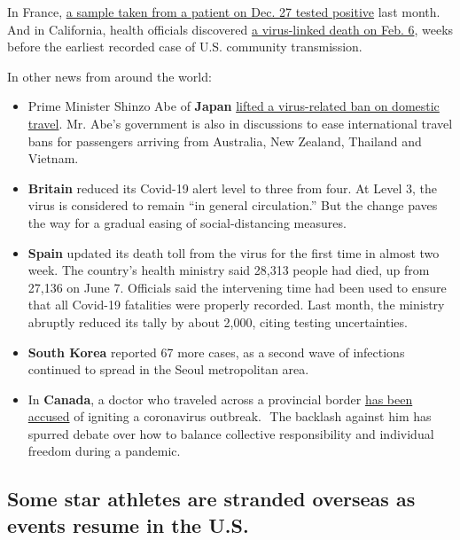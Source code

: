 In France,
\href{https://www.nytimes3xbfgragh.onion/2020/05/05/world/europe/france-coronavirus-timeline.html}{a
sample taken from a patient on Dec. 27 tested positive} last month. And
in California, health officials discovered
\href{https://www.nytimes3xbfgragh.onion/2020/04/22/us/santa-clara-county-coronavirus-death.html}{a
virus-linked death on Feb. 6}, weeks before the earliest recorded case
of U.S. community transmission.

In other news from around the world:

\begin{itemize}
\item
  Prime Minister Shinzo Abe of \textbf{Japan}
  \href{https://www.nytimes3xbfgragh.onion/reuters/2020/06/18/world/asia/18reuters-health-coronavirus-japan-tourism.html}{lifted
  a virus-related ban on domestic travel}. Mr. Abe's government is also
  in discussions to ease international travel bans for passengers
  arriving from Australia, New Zealand, Thailand and Vietnam.
\item
  \textbf{Britain} reduced its Covid-19 alert level to three from four.
  At Level 3, the virus is considered to remain ``in general
  circulation.'' But the change paves the way for a gradual easing of
  social-distancing measures.
\item
  \textbf{Spain} updated its death toll from the virus for the first
  time in almost two week. The country's health ministry said 28,313
  people had died, up from 27,136 on June 7. Officials said the
  intervening time had been used to ensure that all Covid-19 fatalities
  were properly recorded. Last month, the ministry abruptly reduced its
  tally by about 2,000, citing testing uncertainties.
\item
  \textbf{South Korea} reported 67 more cases, as a second wave of
  infections continued to spread in the Seoul metropolitan area.
\item
  In \textbf{Canada}, a doctor who traveled across a provincial border
  \href{https://nyti.ms/2YFwLqs}{has been accused} of igniting a
  coronavirus outbreak. ​ ​​The backlash against him has spurred debate
  over how to balance collective responsibility and individual freedom
  during a pandemic.
\end{itemize}

\hypertarget{some-star-athletes-are-stranded-overseas-as-events-resume-in-the-us}{%
\subsection{Some star athletes are stranded overseas as events resume in
the
U.S.}\label{some-star-athletes-are-stranded-overseas-as-events-resume-in-the-us}}


